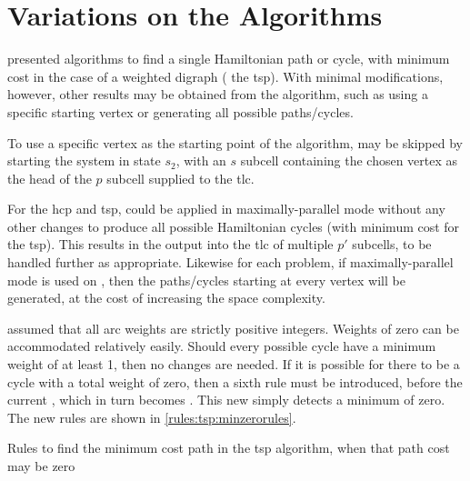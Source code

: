 \section{\label{sec:tsp:variations}Variations on the Algorithms}
 presented algorithms to find a single Hamiltonian path or cycle, with minimum cost in the case of a weighted digraph (\ie{} the \gls{tsp}).  With minimal modifications, however, other results may be obtained from the algorithm, such as using a specific starting vertex or generating all possible paths/cycles.

To use a specific vertex as the starting point of the algorithm,  may be skipped by starting the system in state \(s_2\), with an \(s\) subcell containing the chosen vertex as the head of the \(p\) subcell supplied to the \gls{tlc}.

For the \gls{hcp} and \gls{tsp},  could be applied in maximally-parallel mode without any other changes to produce all possible Hamiltonian cycles (with minimum cost for the \gls{tsp}).  This results in the output into the \gls{tlc} of multiple \(p'\) subcells, to be handled further as appropriate.  Likewise for each problem, if maximally-parallel mode is used on , then the paths/cycles starting at every vertex will be generated, at the cost of increasing the space complexity.

 assumed that all arc weights are strictly positive integers.  Weights of zero can be accommodated relatively easily.  Should every possible cycle have a minimum weight of at least 1, then no changes are needed.  If it is possible for there to be a cycle with a total weight of zero, then a sixth rule must be introduced, before the current , which in turn becomes .  This new  simply detects a minimum of zero.  The new rules are shown in \cref{rules:tsp:minzerorules}.


\begin{cprulesetfloat}
\begin{cpruleset}
    
    
\end{cpruleset}
\caption[Rules to find the minimum cost path when it may be zero]{\label{rules:tsp:minzerorules}Rules to find the minimum cost path in the \gls{tsp} algorithm, when that path cost may be zero}
\end{cprulesetfloat}